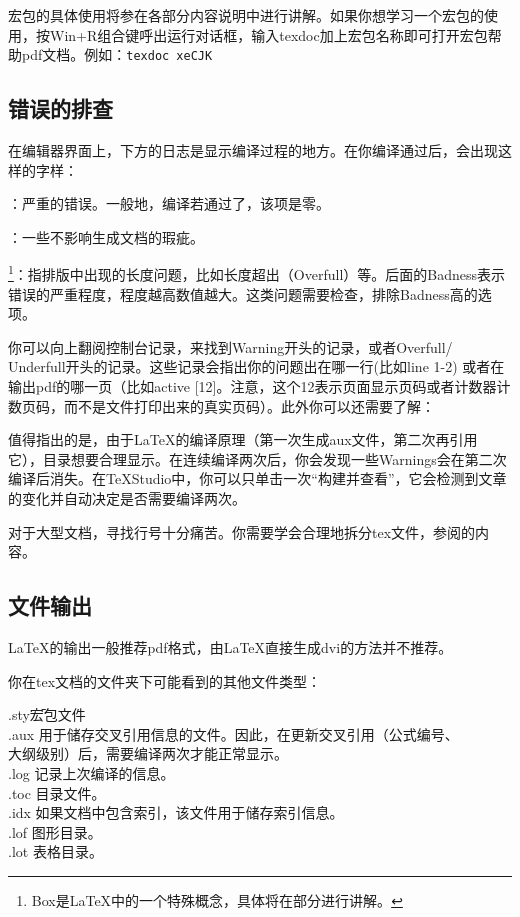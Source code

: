 {宏包的具体使用将参在各部分内容说明中进行讲解。如果你想学习一个宏包的使用，按Win+R组合键呼出运行对话框，输入texdoc加上宏包名称即可打开宏包帮助pdf文档。例如：\verb|texdoc xeCJK|

\subsection{错误的排查}
\label{subsec:debug}
在编辑器界面上，下方的日志是显示编译过程的地方。在你编译通过后，会出现这样的字样：
\begin{feai}
	\item {}：严重的错误。一般地，编译若通过了，该项是零。
	\item {}：一些不影响生成文档的瑕疵。
	\item {\footnote{Box是\LaTeX{}中的一个特殊概念，具体将在\protect{}部分进行讲解。}}：指排版中出现的长度问题，比如长度超出（Overfull）等。后面的Badness表示错误的严重程度，程度越高数值越大。这类问题需要检查，排除Badness高的选项。
\end{feai}

你可以向上翻阅控制台记录，来找到Warning开头的记录，或者Overfull/ Underfull开头的记录。这些记录会指出你的问题出在哪一行(比如line 1-2) 或者在输出pdf的哪一页（比如active [12]。注意，这个12表示页面显示页码或者计数器计数页码，而不是文件打印出来的真实页码）。此外你可以还需要了解：
\begin{feai}
	\item 值得指出的是，由于\LaTeX{}的编译原理（第一次生成aux文件，第二次再引用它），目录想要合理显示。在连续编译两次后，你会发现一些Warnings会在第二次编译后消失。在\TeX Studio中，你可以只单击一次“构建并查看”，它会检测到文章的变化并自动决定是否需要编译两次。
	\item 对于大型文档，寻找行号十分痛苦。你需要学会合理地拆分tex文件，参阅的内容。
\end{feai}
\subsection{文件输出}
\LaTeX{}的输出一般推荐pdf格式，由\LaTeX 直接生成dvi的方法并不推荐。

你在tex文档的文件夹下可能看到的其他文件类型：
\begin{tabbing}
	.sty{\hspace{2em}}\=宏包文件\\
	.aux    \> 用于储存交叉引用信息的文件。因此，在更新交叉引用（公式编号、\\
	\> 大纲级别）后，需要编译两次才能正常显示。\\
	.log    \> 记录上次编译的信息。\\
	.toc    \> 目录文件。\\
	.idx    \> 如果文档中包含索引，该文件用于储存索引信息。\\
	.lof    \> 图形目录。\\
	.lot    \> 表格目录。
\end{tabbing}

}
